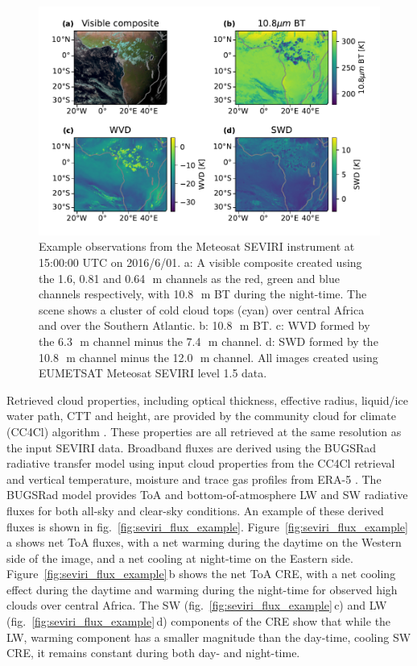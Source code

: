 \documentclass[acp, manuscript]{copernicus}
\begin{document}
\begin{figure}[tp]
    \includegraphics[width=12cm]{figures/fig01.pdf}
    \caption[
    Example observations from the Meteosat SEVIRI instrument at 15:00:00 UTC on 2016/6/01
    ]{
    Example observations from the Meteosat SEVIRI instrument at 15:00:00 UTC on 2016/6/01. a: A visible composite created using the 1.6, 0.81 and 0.64\,\unit{\mu m} channels as the red, green and blue channels respectively, with 10.8\,\unit{\mu m} BT during the night-time. The scene shows a cluster of cold cloud tops (cyan) over central Africa and over the Southern Atlantic. b: 10.8\,\unit{\mu m} BT. c: WVD formed by the 6.3\,\unit{\mu m} channel minus the 7.4\,\unit{\mu m} channel. d: SWD formed by the 10.8\,\unit{\mu m} channel minus the 12.0\,\unit{\mu m} channel. All images created using EUMETSAT Meteosat SEVIRI level 1.5 data.
    }
    \label{fig:seviri_obs_example}
\end{figure}


Retrieved cloud properties, including optical thickness, effective radius, liquid/ice water path, CTT and height, are provided by the community cloud for climate (CC4Cl) algorithm \citep{sus_community_2018, mcgarragh_community_2018}. 
These properties are all retrieved at the same resolution as the input SEVIRI data. Broadband fluxes are derived using the BUGSRad radiative transfer model \citep{stephens_parameterization_2001} using input cloud properties from the CC4Cl retrieval and vertical temperature, moisture and trace gas profiles from ERA-5 \citep{hersbach_era5_2020}. 
The BUGSRad model provides ToA and bottom-of-atmosphere LW and SW radiative fluxes for both all-sky and clear-sky conditions. An example of these derived fluxes is shown in fig.~\ref{fig:seviri_flux_example}. 
Figure~\ref{fig:seviri_flux_example}\,a shows net ToA fluxes, with a net warming during the daytime on the Western side of the image, and a net cooling at night-time on the Eastern side. 
Figure~\ref{fig:seviri_flux_example}\,b shows the net ToA CRE, with a net cooling effect during the daytime and warming during the night-time for observed high clouds over central Africa. The SW (fig.~\ref{fig:seviri_flux_example}\,c) and LW (fig.~\ref{fig:seviri_flux_example}\,d) components of the CRE show that while the LW,
warming component has a smaller magnitude than the day-time, cooling SW CRE, it remains constant during both day- and night-time.
\end{document}
